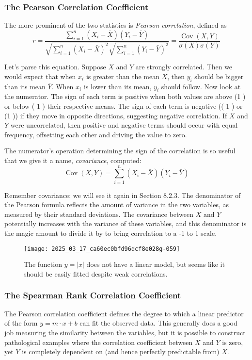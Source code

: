 \documentclass[10pt]{article}
\begin{document}
\subsubsection{The Pearson Correlation Coefficient}
The more prominent of the two statistics is \textit{Pearson correlation}, defined as
\[
r=\frac{\sum_{i=1}^{n}\left(X_{i}-\bar{X}\right)\left(Y_{i}-\bar{Y}\right)}{\sqrt{\sum_{i=1}^{n}\left(X_{i}-\bar{X}\right)^{2}} \sqrt{\sum_{i=1}^{n}\left(Y_{i}-\bar{Y}\right)^{2}}}=\frac{\operatorname{Cov}(X, Y)}{\sigma(X) \sigma(Y)}
\]

Let's parse this equation. Suppose \(X\) and \(Y\) are strongly correlated. Then we would expect that when \(x_{i}\) is greater than the mean \(\bar{X}\), then \(y_{i}\) should be bigger than its mean \(\bar{Y}\). When \(x_{i}\) is lower than its mean, \(y_{i}\) should follow. Now look at the numerator. The sign of each term is positive when both values are above (1 ) or below (-1 ) their respective means. The sign of each term is negative ((-1 ) or (1 )) if they move in opposite directions, suggesting negative correlation. If \(X\) and \(Y\) were uncorrelated, then positive and negative terms should occur with equal frequency, offsetting each other and driving the value to zero.

The numerator's operation determining the sign of the correlation is so useful that we give it a name, \textit{covariance}, computed:
\[
\operatorname{Cov}(X, Y)=\sum_{i=1}^{n}\left(X_{i}-\bar{X}\right)\left(Y_{i}-\bar{Y}\right)
\]

Remember covariance: we will see it again in Section 8.2.3. The denominator of the Pearson formula reflects the amount of variance in the two variables, as measured by their standard deviations. The covariance between \(X\) and \(Y\) potentially increases with the variance of these variables, and this denominator is the magic amount to divide it by to bring correlation to a -1 to 1 scale.

\begin{figure}[h]
    \centering
    \texttt{[image: 2025\_03\_17\_ca60ec0bfd96dcf8e028g-059]}
    \caption{The function \(y=|x|\) does not have a linear model, but seems like it should be easily fitted despite weak correlations.}
\end{figure}

\subsubsection{The Spearman Rank Correlation Coefficient}
The Pearson correlation coefficient defines the degree to which a linear predictor of the form \(y=m \cdot x+b\) can fit the observed data. This generally does a good job measuring the similarity between the variables, but it is possible to construct pathological examples where the correlation coefficient between \(X\) and \(Y\) is zero, yet \(Y\) is completely dependent on (and hence perfectly predictable from) \(X\).
\end{document}
